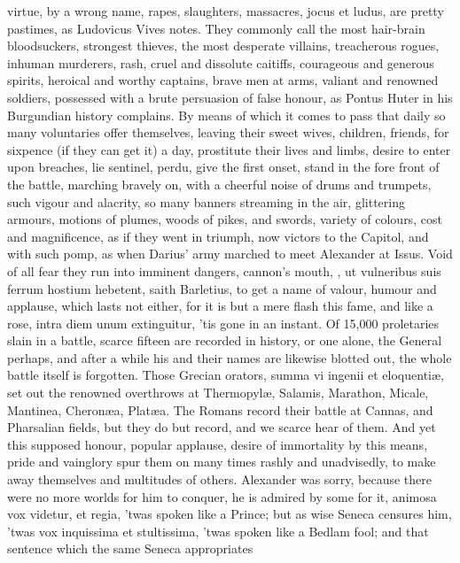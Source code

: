 {virtue, by a wrong name, rapes, slaughters, massacres, \etc{} jocus et
ludus, are pretty pastimes, as Ludovicus Vives notes. They
commonly call the most hair-brain bloodsuckers, strongest thieves, the
most desperate villains, treacherous rogues, inhuman murderers, rash,
cruel and dissolute caitiffs, courageous and generous spirits, heroical
and worthy captains, brave men at arms, valiant and renowned
soldiers, possessed with a brute persuasion of false honour, as Pontus
Huter in his Burgundian history complains. By means of which it comes
to pass that daily so many voluntaries offer themselves, leaving their
sweet wives, children, friends, for sixpence (if they can get it) a
day, prostitute their lives and limbs, desire to enter upon breaches,
lie sentinel, perdu, give the first onset, stand in the fore front of
the battle, marching bravely on, with a cheerful noise of drums and
trumpets, such vigour and alacrity, so many banners streaming in the
air, glittering armours, motions of plumes, woods of pikes, and swords,
variety of colours, cost and magnificence, as if they went in triumph,
now victors to the Capitol, and with such pomp, as when Darius' army
marched to meet Alexander at Issus. Void of all fear they run into
imminent dangers, cannon's mouth, \etc{}, ut vulneribus suis ferrum
hostium hebetent, saith Barletius, to get a name of valour, humour
and applause, which lasts not either, for it is but a mere flash this
fame, and like a rose, intra diem unum extinguitur, 'tis gone in an
instant. Of 15,000 proletaries slain in a battle, scarce fifteen are
recorded in history, or one alone, the General perhaps, and after a
while his and their names are likewise blotted out, the whole battle
itself is forgotten. Those Grecian orators, summa vi ingenii et
eloquenti\ae{}, set out the renowned overthrows at Thermopyl\ae{}, Salamis,
Marathon, Micale, Mantinea, Cheron\ae{}a, Plat\ae{}a. The Romans record their
battle at Cannas, and Pharsalian fields, but they do but record, and we
scarce hear of them. And yet this supposed honour, popular applause,
desire of immortality by this means, pride and vainglory spur them on
many times rashly and unadvisedly, to make away themselves and
multitudes of others. Alexander was sorry, because there were no more
worlds for him to conquer, he is admired by some for it, animosa vox
videtur, et regia, 'twas spoken like a Prince; but as wise Seneca
censures him, 'twas vox inquissima et stultissima, 'twas spoken like a
Bedlam fool; and that sentence which the same Seneca appropriates
}
